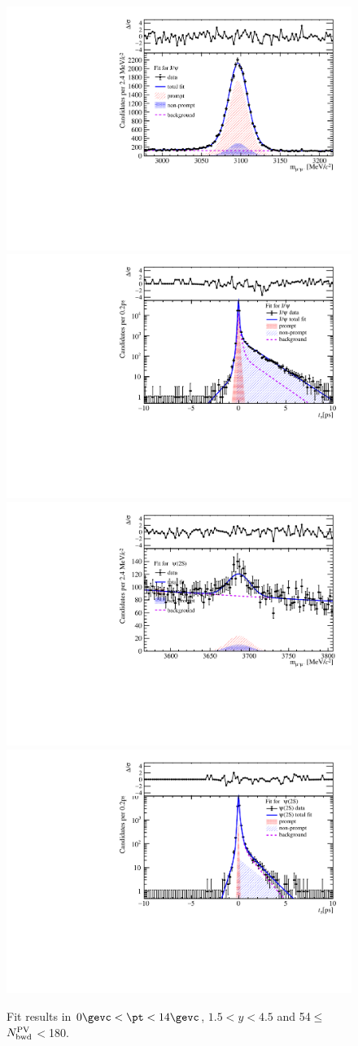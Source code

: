 \begin{figure}[H]
\begin{center}
\includegraphics[width=0.45\linewidth]{pdf/pPb/BWorkdir/TwoDimFit/ProjMass/Jpsi_n5y1pt1.pdf}
\includegraphics[width=0.45\linewidth]{pdf/pPb/BWorkdir/TwoDimFit/ProjTz/Jpsi_n5y1pt1.pdf}
\vspace*{-0.5cm}
\includegraphics[width=0.45\linewidth]{pdf/pPb/BWorkdir/TwoDimFit/ProjMass/Psi2S_n5y1pt1.pdf}
\includegraphics[width=0.45\linewidth]{pdf/pPb/BWorkdir/TwoDimFit/ProjTz/Psi2S_n5y1pt1.pdf}
\vspace*{-0.5cm}
\end{center}
\caption{Fit results in $0\gevc<\pt<14\gevc$, $1.5<y<4.5$ and 54$\leq$$N^{\rm PV}_{\rm bwd}$$<$180.}
\end{figure}


